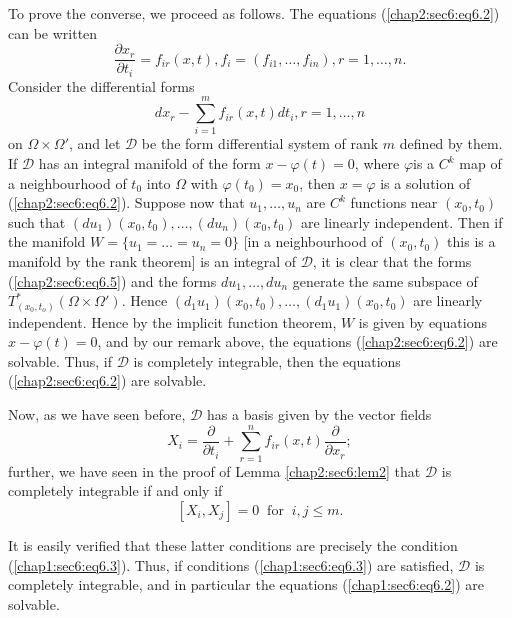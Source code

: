 To prove the converse, we proceed as follows. The equations
(\ref{chap2:sec6:eq6.2}) can be written 
\begin{equation*}
  \frac{\partial x_r}{\partial t_i} = f_{ir} (x, t), f_i = (f_{i1},
  \ldots, f_{in}), r=1, \ldots,n. \tag{6.4}\label{chap2:sec6:eq6.4} 
\end{equation*}
Consider the differential forms
\begin{equation*}
  dx_r - \sum^m_{i=1} f_{ir} (x, t) dt_i, r=1, \ldots, n
  \tag{6.5}\label{chap2:sec6:eq6.5} 
\end{equation*}
on $\Omega \times \Omega'$, and let $\mathscr{D}$ be the form
differential system of rank $m$ defined by them. If $\mathscr{D}$ has
an integral manifold of the form $x - \varphi (t) = 0$, where
$\varphi$\pageoriginale is a $C^k$ map of a neighbourhood of $t_0$ into $\Omega$
with $\varphi (t_0)=x_0$, then $x = \varphi$ is a solution of
(\ref{chap2:sec6:eq6.2}). Suppose now that $u_1, \ldots, u_n$ are
$C^k$ functions near 
$(x_0, t_0)$ such that $(du_1) (x_0, t_0), \ldots , (du_n) (x_0, t_0)$
are linearly independent. Then if the manifold $W= \{u_1 = \ldots =
u_n =0 \}$ [in a neighbourhood of $(x_0, t_0)$ this is a manifold by
  the rank theorem] is an integral of $\mathscr{D}$, it is clear that
the forms (\ref{chap2:sec6:eq6.5}) and the forms $du_1, \ldots ,du_n$ generate the same
subspace of $T^*_{(x_0, t_o)}(\Omega \times \Omega')$. Hence $(d_1
u_1) (x_0, t_0), \ldots ,(d_1 u_1)(x_0,t_0)$ are linearly
independent. Hence by the implicit function theorem, $W$ is given by
equations $x - \varphi(t) = 0$, and by our remark above, the equations
(\ref{chap2:sec6:eq6.2}) are solvable. Thus, if $\mathscr{D}$ is
completely integrable, 
then the equations (\ref{chap2:sec6:eq6.2}) are solvable. 

Now, as we have seen before, $\mathscr{D}$ has a basis given by the
vector fields 
\begin{equation*}
  X_i = \frac{\partial}{\partial t_i} + \sum^n_{r=1} f_{ir}(x, t)
  \frac{\partial}{\partial x_r}; \tag{6.6}\label{chap2:sec6:eq6.6} 
\end{equation*}
further, we have seen in the proof of Lemma \ref{chap2:sec6:lem2} that
$\mathscr{D}$ is completely integrable if and only if 
$$
[X_i, X_j] = 0 ~\text{ for }~ i, j \leq m.
$$

It is easily verified that these latter conditions are precisely the
condition (\ref{chap1:sec6:eq6.3}). Thus, if conditions
(\ref{chap1:sec6:eq6.3}) are satisfied,
$\mathscr{D}$ is completely integrable, and in particular the
equations (\ref{chap1:sec6:eq6.2}) are solvable.  

